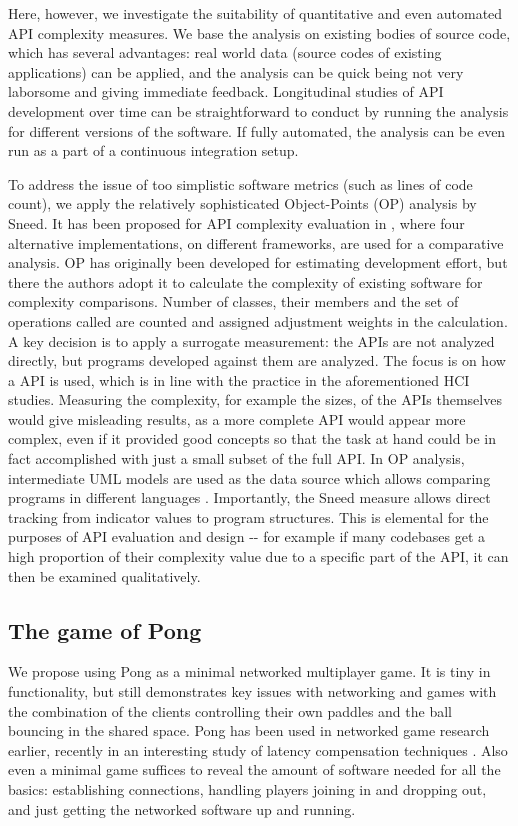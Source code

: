 \documentclass[conference]{IEEEtran}
\begin{document}
Here, however, we investigate the suitability of quantitative and even
automated API complexity measures. We base the analysis on existing
bodies of source code, which has several advantages: real world data
(source codes of existing applications) can be applied, and the
analysis can be quick being not very laborsome and giving immediate
feedback. Longitudinal studies of API development over time can be
straightforward to conduct by running the analysis for different
versions of the software. If fully automated, the analysis can be even
run as a part of a continuous integration setup.

To address the issue of too simplistic software metrics (such as lines
of code count), we apply the relatively sophisticated Object-Points
(OP) analysis by Sneed. It has been proposed for API complexity
evaluation in \cite{api-complexity-analysis}, where four alternative
implementations, on different frameworks, are used for a comparative
analysis. OP has originally been developed for estimating development
effort, but there the authors adopt it to calculate the complexity of
existing software for complexity comparisons. Number of classes, their
members and the set of operations called are counted and assigned
adjustment weights in the calculation. A key decision is to apply a
surrogate measurement: the APIs are not analyzed directly, but
programs developed against them are analyzed. The focus is on how a
API is used, which is in line with the practice in the aforementioned
HCI studies. Measuring the complexity, for example the sizes, of the
APIs themselves would give misleading results, as a more complete API
would appear more complex, even if it provided good concepts so that
the task at hand could be in fact accomplished with just a small
subset of the full API. In OP analysis, intermediate UML models are
used as the data source which allows comparing programs in different
languages \cite{api-complexity-analysis}. Importantly, the Sneed measure
allows direct tracking from indicator values to program
structures. This is elemental for the purposes of API evaluation and
design -{}- for example if many codebases get a high proportion of their
complexity value due to a specific part of the API, it can then be
examined qualitatively.


\subsection{The game of Pong%
  \label{the-game-of-pong}%
}

We propose using Pong as a minimal networked multiplayer game. It is
tiny in functionality, but still demonstrates key issues with
networking and games with the combination of the clients controlling
their own paddles and the ball bouncing in the shared space. Pong has
been used in networked game research earlier, recently in an
interesting study of latency compensation techniques
\cite{pong-ping}. Also even a minimal game suffices to reveal the amount
of software needed for all the basics: establishing connections,
handling players joining in and dropping out, and just getting the
networked software up and running.
\end{document}
